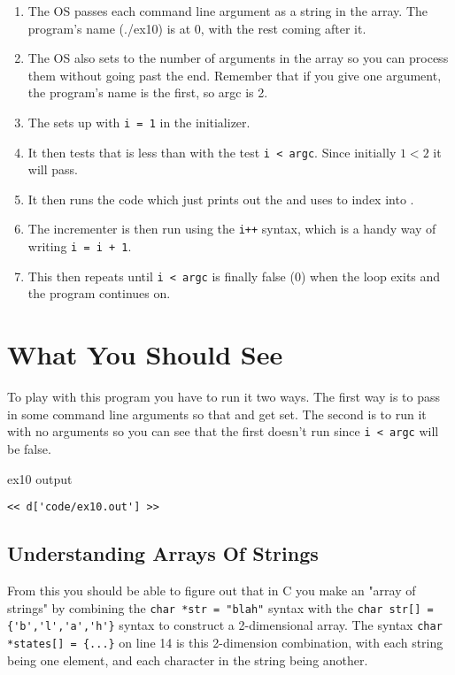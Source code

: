 \begin{enumerate}
\item The OS passes each command line argument as a string in the 
    array.  The program's name (./ex10) is at 0, with the rest coming after it.
\item The OS also sets  to the number of arguments in the 
    array so you can process them without going past the end.  Remember that if you
    give one argument, the program's name is the first, so argc is 2.
\item The  sets up with \verb|i = 1| in the initializer.
\item It then tests that  is less than  with the
    test \verb|i < argc|. Since initially $1 < 2$ it will pass.
\item It then runs the code which just prints out the  and 
    uses  to index into .
\item The incrementer is then run using the \verb|i++| syntax, which is
    a handy way of writing \verb|i = i + 1|.
\item This then repeats until \verb|i < argc| is finally false (0) when
    the loop exits and the program continues on.
\end{enumerate}


\section{What You Should See}

To play with this program you have to run it two ways.  The first way is to
pass in some command line arguments so that  and 
get set.  The second is to run it with no arguments so you can see that
the first  doesn't run since \verb|i < argc| will be false.

\begin{code}{ex10 output}
\begin{lstlisting}
<< d['code/ex10.out'] >>
\end{lstlisting}
\end{code}

\subsection{Understanding Arrays Of Strings}

From this you should be able to figure out that in C you make an "array of
strings" by combining the \verb|char *str = "blah"| syntax with the
\verb|char str[] = {'b','l','a','h'}| syntax to construct a 2-dimensional
array.  The syntax \verb|char *states[] = {...}| on line 14 is this
2-dimension combination, with each string being one element, and each
character in the string being another.

